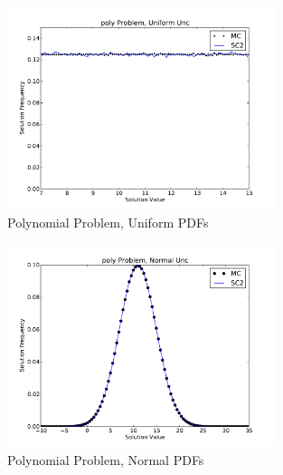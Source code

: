 \begin{figure}[h]
\centering
   \includegraphics[width=0.7\textwidth]{../graphics/poly_uniform_pdfs}
   \caption{Polynomial Problem, Uniform PDFs}
      \label{fig:poly uni}
\end{figure}
\begin{figure}[h]
\centering
   \includegraphics[width=0.7\textwidth]{../graphics/poly_normal_pdfs}
   \caption{Polynomial Problem, Normal PDFs}
      \label{fig:poly norm}
\end{figure}
